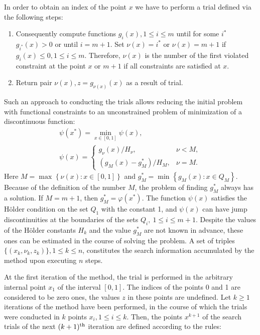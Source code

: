 \documentclass[runningheads]{llncs}
\begin{document}
In order to obtain an index of the point \(x\) we have to perform a trial defined via the following steps:
\begin{enumerate}
  \item Consequently compute functions \(g_i(x),1 \leqslant i \leqslant m\) until for some \(i^*\) \(g_{i^*}(x)>0\) or until \(i=m+1\).
  Set \(\nu(x)=i^*\) or \(\nu(x)=m+1\) if \(g_i(x) \leqslant 0, 1 \leqslant i \leqslant m\).
  Therefore, \(\nu(x)\) is the number of the first violated constraint at the point \(x\) or \(m+1\) if
  all constraints are satisfied at \(x\).
  \item Return pair \(\nu(x), z=g_{\nu(x)}(x)\) as a result of trial.
\end{enumerate}

Such an approach to conducting the trials allows reducing the initial problem with functional
constraints to an unconstrained problem of minimization of a discontinuous function:
\begin{displaymath}
  \begin{array}{lr}
    \psi (x^{*})=\min_{x\in [0,1]}\psi (x), \\
    \psi (x)={\begin{cases}g_{\nu }(x)/H_{\nu },&\nu <M,\\(g_{M}(x)-g_{M}^{*})/H_{M},&\nu
=M.\end{cases}}
  \end{array}
\end{displaymath}
Here \(M=\max_{}^{}\left\{\nu (x):x\in [0,1]\right\}\) and \(g_{M}^{*}=\min
_{}^{}\left\{g_{M}(x):x\in Q_{M}\right\}\).
Because of the definition of the number \(M\), the problem of finding \(g_{M}^{*}\) always
has a solution. If \(M=m+1\), then \(g_{M}^{*}=\varphi(x^{*})\).
The function \(\psi (x)\) satisfies the H\"{o}lder condition on the set
\(Q_1\) with the constant 1, and \(\psi (x)\) can have jump discontinuities at the boundaries
of the sets \(Q_i,\:1\leqslant i \leqslant m+1\).
Despite the values of the H\"{o}lder constants \(H_k\) and the value \(g_{M}^{*}\) are not
known in advance, these ones can be estimated in the course of solving the problem.
A set of triples \(\{(x_k,\nu_k,z_k)\}, 1\leqslant k\leqslant n\), constitutes the search information
accumulated by the method upon executing \(n\) steps.

At the first iteration of the method, the trial is performed in the arbitrary internal point \(x_1\) of
the interval \([0,1]\).
The indices of the points 0 and 1 are considered to be zero ones, the values \(z\) in these points
are undefined.
Let \(k\geqslant 1\) iterations of the method have been performed, in the course of which the
trials were conducted in \(k\) points \(x_i, 1\leqslant i\leqslant k\).
Then, the points \(x^{k+1}\) of the search trials of the next \((k+1)^{\rm th}\) iteration are
defined according to the rules:
\end{document}
